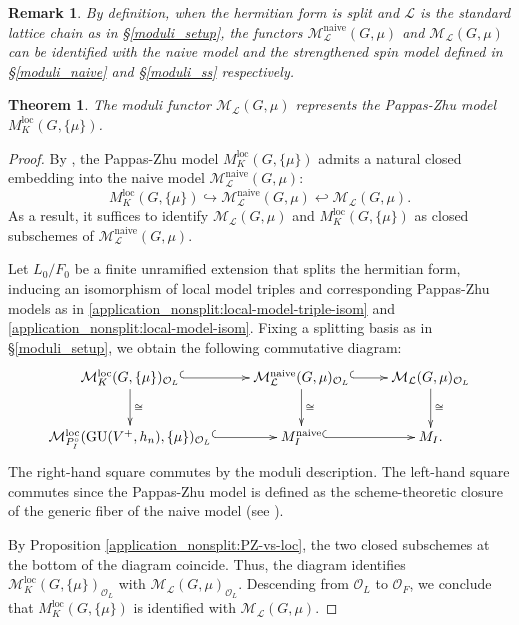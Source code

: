 \documentclass[pdflatex,sn-mathphys-num]{sn-jnl}%
\theoremstyle{thmstyleone}%
\newtheorem{theorem}[subsubsection]{Theorem}%
\theoremstyle{thmstyletwo}%
\newtheorem{remark}[subsubsection]{Remark}%
\numberwithin{equation}{subsection}
\theoremstyle{thmstylethree}%
\newcommand{\CL}{\ensuremath{\mathcal{L}}\xspace}
\newcommand{\CM}{\ensuremath{\mathcal{M}}\xspace}
\newcommand{\CO}{\ensuremath{\mathcal{O}}\xspace}
\newcommand{\GU}{\mathrm{GU}}
\newcommand{\loc}{\ensuremath{\mathrm{loc}}\xspace}
\newcommand{\naive}{\ensuremath{\mathrm{naive}}\xspace}
\begin{document}
\begin{remark}\label{application_moduli:comparison-of-moduli}
By definition, when the hermitian form is split and $\CL$ is the standard lattice chain as in \S \ref{moduli_setup}, the functors $\CM_\CL^\naive(G,\mu)$ and $\CM_\CL(G,\mu)$ can be identified with the naive model and the strengthened spin model defined in \S \ref{moduli_naive} and \S \ref{moduli_ss} respectively.
\end{remark}


		
\begin{theorem}\label{application_moduli:main}
	The moduli functor $\CM_\CL(G,\mu)$ represents the Pappas-Zhu model $M^\loc_{K}(G,\{\mu\})$.
\end{theorem}
\begin{proof}
By  \cite[Lemma 4.1]{HPR}, the Pappas-Zhu model $M_{K}^\loc(G,\{\mu\})$ admits a natural closed embedding into the naive model $\CM_\CL^\naive(G,\mu)$:
\begin{equation*}
    M_{K}^\loc(G,\{\mu\})\hookrightarrow \CM_\CL^\naive(G,\mu)\hookleftarrow \CM_\CL(G,\mu).
\end{equation*}
As a result, it suffices to identify $\CM_\CL(G,\mu)$ and $M_K^\loc(G,\{\mu\})$ as closed subschemes of $\CM_\CL^\naive(G,\mu)$.

Let $L_0/F_0$ be a finite unramified extension that splits the hermitian form, inducing an isomorphism of local model triples and corresponding Pappas-Zhu models as in \eqref{application_nonsplit:local-model-triple-isom} and \eqref{application_nonsplit:local-model-isom}.
Fixing a splitting basis as in \S \ref{moduli_setup}, we obtain the following commutative diagram:
\begin{equation*}
\begin{aligned}
\xymatrix{
\CM^\loc_K(G,\{\mu\})_{\CO_L}\ar@{^(->}[r]\ar[d]^{\cong} &   \CM_\CL^\naive(G,\mu)_{\CO_L}\ar[d]^{\cong}\ar@{^(->}[r] &   \CM_\CL(G,\mu)_{\CO_L}\ar[d]^{\cong}\\
\CM^\loc_{P_I^\circ}(\GU(V^+,h_n),\{\mu\})_{\CO_L}\ar@{^(->}[r]  &   M^\naive_I\ar@{^(->}[r]  &   M_I.
}
\end{aligned}
\end{equation*}
The right-hand square commutes by the moduli description.
The left-hand square commutes since the Pappas-Zhu model is defined as the scheme-theoretic closure of the generic fiber of the naive model (see \cite[Lemma 4.1]{HPR}).

By Proposition \ref{application_nonsplit:PZ-vs-loc}, the two closed subschemes at the bottom of the diagram coincide.
Thus, the diagram identifies $\CM^\loc_K(G,\{\mu\})_{\CO_L}$ with $\CM_\CL(G,\mu)_{\CO_L}$.
Descending from $\CO_L$ to $\CO_F$, we conclude that $M_K^\loc(G,\{\mu\})$ is identified with $\CM_\CL(G,\mu)$.
\end{proof}
\end{document}
